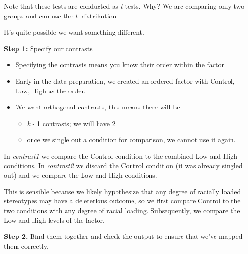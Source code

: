 \documentclass[
  english,
]{book}
\newenvironment{Shaded}{\begin{snugshade}}{\end{snugshade}}
\newcommand{\CommentTok}[1]{\textcolor[rgb]{0.56,0.35,0.01}{\textit{#1}}}
\newcommand{\DecValTok}[1]{\textcolor[rgb]{0.00,0.00,0.81}{#1}}
\newcommand{\FunctionTok}[1]{\textcolor[rgb]{0.00,0.00,0.00}{#1}}
\newcommand{\NormalTok}[1]{#1}
\newcommand{\OtherTok}[1]{\textcolor[rgb]{0.56,0.35,0.01}{#1}}
\newcommand{\SpecialCharTok}[1]{\textcolor[rgb]{0.00,0.00,0.00}{#1}}
\providecommand{\tightlist}{%
  \setlength{\itemsep}{0pt}\setlength{\parskip}{0pt}}
\begin{document}
Note that these tests are conducted as \emph{t} tests. Why? We are comparing only two groups and can use the \emph{t}. distribution.

It's quite possible we want something different.

\textbf{Step 1: } Specify our contrasts

\begin{itemize}
\tightlist
\item
  Specifying the contrasts means you know their order within the factor
\item
  Early in the data preparation, we created an ordered factor with Control, Low, High as the order.
\item
  We want orthogonal contrasts, this means there will be

  \begin{itemize}
  \tightlist
  \item
    \emph{k} - 1 contrasts; we will have 2
  \item
    once we single out a condition for comparison, we cannot use it again.
  \end{itemize}
\end{itemize}

In \emph{contrast1} we compare the Control condition to the combined Low and High conditions.
In \emph{contrast2} we discard the Control condition (it was already singled out) and we compare the Low and High conditions.

This is sensible because we likely hypothesize that any degree of racially loaded stereotypes may have a deleterious outcome, so we first compare Control to the two conditions with any degree of racial loading. Subsequently, we compare the Low and High levels of the factor.

\textbf{Step 2:} Bind them together and check the output to ensure that we've mapped them correctly.

\begin{Shaded}
\end{Shaded}
\end{document}
